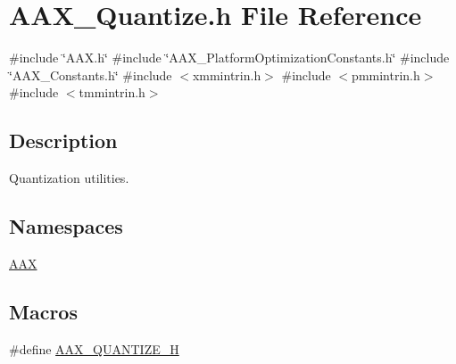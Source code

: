 \hypertarget{a00776}{}\section{A\+A\+X\+\_\+\+Quantize.\+h File Reference}
\label{a00776}
{\ttfamily \#include \char`\"{}A\+A\+X.\+h\char`\"{}}\newline
{\ttfamily \#include \char`\"{}A\+A\+X\+\_\+\+Platform\+Optimization\+Constants.\+h\char`\"{}}\newline
{\ttfamily \#include \char`\"{}A\+A\+X\+\_\+\+Constants.\+h\char`\"{}}\newline
{\ttfamily \#include $<$xmmintrin.\+h$>$}\newline
{\ttfamily \#include $<$pmmintrin.\+h$>$}\newline
{\ttfamily \#include $<$tmmintrin.\+h$>$}\newline


\subsection{Description}
Quantization utilities. 

\subsection*{Namespaces}
\begin{DoxyCompactItemize}
\item 
 \mbox{\hyperlink{a00852}{A\+AX}}
\end{DoxyCompactItemize}
\subsection*{Macros}
\begin{DoxyCompactItemize}
\item 
\#define \mbox{\hyperlink{a00776_a8110c1ecf6144fb29de6c94c0572327c}{A\+A\+X\+\_\+\+Q\+U\+A\+N\+T\+I\+Z\+E\+\_\+H}}
\end{DoxyCompactItemize}
